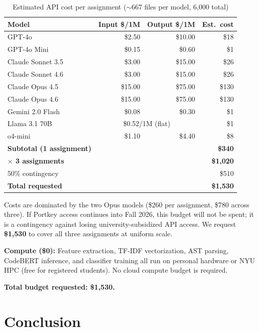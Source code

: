\documentclass[sigconf]{acmart}
\begin{document}
\begin{table}[h]
\caption{Estimated API cost per assignment ($\sim$667 files per model, 6,000 total)}
\label{tab:budget}
\small
\begin{tabular}{lrrr}
\toprule
Model & Input \$/1M & Output \$/1M & Est.\ cost \\
\midrule
GPT-4o            & \$2.50  & \$10.00 & \$18 \\
GPT-4o Mini       & \$0.15  & \$0.60  & \$1  \\
Claude Sonnet 3.5 & \$3.00  & \$15.00 & \$26 \\
Claude Sonnet 4.6 & \$3.00  & \$15.00 & \$26 \\
Claude Opus 4.5   & \$15.00 & \$75.00 & \$130 \\
Claude Opus 4.6   & \$15.00 & \$75.00 & \$130 \\
Gemini 2.0 Flash  & \$0.08  & \$0.30  & \$1  \\
Llama 3.1 70B     & \multicolumn{2}{c}{\$0.52/1M (flat)} & \$1  \\
o4-mini           & \$1.10  & \$4.40  & \$8  \\
\midrule
\textbf{Subtotal (1 assignment)} & & & \textbf{\$340} \\
\textbf{$\times$ 3 assignments}  & & & \textbf{\$1,020} \\
50\% contingency                 & & & \$510 \\
\midrule
\textbf{Total requested} & & & \textbf{\$1,530} \\
\bottomrule
\end{tabular}
\end{table}

Costs are dominated by the two Opus models (\$260 per assignment, \$780 across three). If Portkey access continues into Fall 2026, this budget will not be spent; it is a contingency against losing university-subsidized API access. We request \textbf{\$1,530} to cover all three assignments at uniform scale.

\textbf{Compute (\$0):} Feature extraction, TF-IDF vectorization, AST parsing, CodeBERT inference, and classifier training all run on personal hardware or NYU HPC (free for registered students). No cloud compute budget is required.

\textbf{Total budget requested: \$1,530.}

\section{Conclusion}
\end{document}

